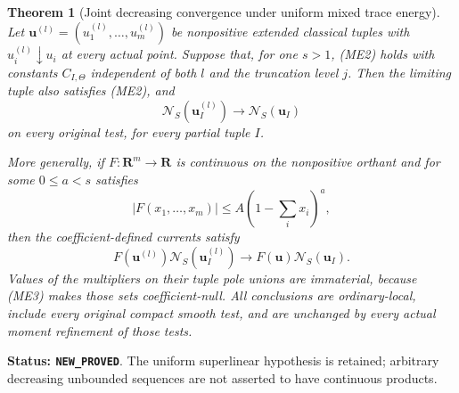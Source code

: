 \documentclass[11pt,a4paper]{article}
\numberwithin{equation}{section}
\newtheorem{theorem}{Theorem}[section]
\theoremstyle{definition}
\theoremstyle{remark}
\begin{document}
\begin{theorem}[Joint decreasing convergence under uniform mixed trace energy]
\label{thm:r11-unbounded-joint-continuity}
Let $\mathbf u^{(l)}=(u_1^{(l)},\ldots,u_m^{(l)})$ be nonpositive
extended classical tuples with $u_i^{(l)}\downarrow u_i$ at every
actual point.  Suppose that, for one $s>1$, (ME2) holds with constants
$C_{I,\Theta}$ independent of both $l$ and the truncation level $j$.
Then the limiting tuple also satisfies (ME2), and
\[
 \mathcal N_S(\mathbf u_I^{(l)})
                  \longrightarrow\mathcal N_S(\mathbf u_I)
 \tag{ME8}
\]
on every original test, for every partial tuple $I$.

More generally, if $F:\mathbf R^m\to\mathbf R$ is continuous on the
nonpositive orthant and for some $0\leq a<s$ satisfies
\[
 |F(x_1,\ldots,x_m)|\leq A(1-\textstyle\sum_i x_i)^a,
 \tag{ME9}
\]
then the coefficient-defined currents satisfy
\[
 F(\mathbf u^{(l)})\mathcal N_S(\mathbf u_I^{(l)})
             \longrightarrow F(\mathbf u)\mathcal N_S(\mathbf u_I).
 \tag{ME10}
\]
Values of the multipliers on their tuple pole unions are immaterial,
because (ME3) makes those sets coefficient-null.  All conclusions are
ordinary-local, include every original compact smooth test, and are
unchanged by every actual moment refinement of those tests.
\end{theorem}

\noindent\textbf{Status: \texttt{NEW\_PROVED}}.  The uniform
superlinear hypothesis is retained; arbitrary decreasing unbounded
sequences are not asserted to have continuous products.
\end{document}
